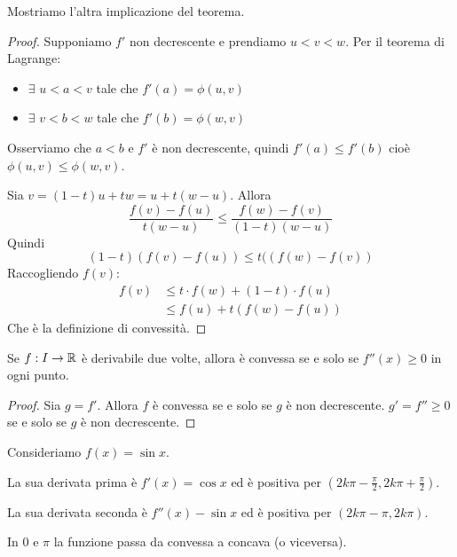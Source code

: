 Mostriamo l'altra implicazione del teorema.
\begin{proof}
Supponiamo $f'$ non decrescente e prendiamo $u < v < w$. Per il teorema di Lagrange:
\begin{itemize}
\item $\exists$ $u < a < v$ tale che $f'(a) = \phi(u,v)$
\item $\exists$ $v < b < w$ tale che $f'(b) = \phi(w,v)$
\end{itemize}

Osserviamo che $a < b$ e $f'$ è non decrescente, quindi $f'(a) \le f'(b)$ cioè $\phi(u,v)  \le \phi(w,v)$.

Sia $v = (1-t)u + tw = u + t(w-u)$. Allora
\begin{equation*}
\frac{f(v)-f(u)}{t(w-u)} \le \frac{f(w)-f(v)}{(1-t)(w-u)}
\end{equation*}
Quindi
\begin{equation*}
(1-t)(f(v)-f(u)) \le t((f(w)-f(v))
\end{equation*}
Raccogliendo $f(v)$:
\begin{align*}
f(v) &\le t\cdot f(w) + (1-t) \cdot f(u) \\
&\le f(u) + t(f(w)-f(u))
\end{align*}
Che è la definizione di convessità.
\end{proof}

\begin{corollary}
Se $f: I \to \mathbb R$ è derivabile due volte, allora è convessa se e solo se $f''(x) \ge 0$ in ogni punto.
\end{corollary}

\begin{proof}
Sia $g=f'$. Allora $f$ è convessa se e solo se $g$ è non decrescente. $g' =  f'' \ge 0$ se e solo se $g$ è non decrescente.
\end{proof}

\begin{example}
Consideriamo $f(x) = \sin x$. 

La sua derivata prima è $f'(x) = \cos x$ ed è positiva per $(2k\pi - \frac{\pi}{2}, 2k\pi + \frac{\pi}{2})$.

La sua derivata seconda è $f''(x) - \sin x$ ed è positiva per $(2k\pi - \pi, 2k\pi)$.

\begin{center}
\end{center}

In $0$ e $\pi$ la funzione passa da convessa a concava (o viceversa).
\end{example}

